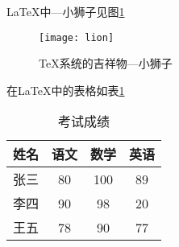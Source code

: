 \documentclass[a4paper, oneside]{ctexart}
\begin{document}
	\LaTeX{}中---小狮子见图\ref{fig-lion}	%
	\begin{figure}[htbp]	%
		\centering	%
		\caption{\TeX 系统的吉祥物---小狮子}\label{fig-lion}	%

		\texttt{[image: lion]}
	\end{figure}
	
	在\LaTeX{}中的表格如表\ref{tab-score}
	\begin{table}[htbp]	%
		\centering
		\caption{考试成绩}\label{tab-score}	%
		
		\begin{tabular}{c|c|c|c|}
			\hline
			姓名 & 语文 & 数学 & 英语 \\
			\hline
			张三 & 80 & 100 & 89 \\
			\hline
			李四 & 90 & 98 & 20 \\
			\hline
			王五 & 78 & 90 & 77 \\
			\hline
		\end{tabular}
	\end{table}
\end{document}
